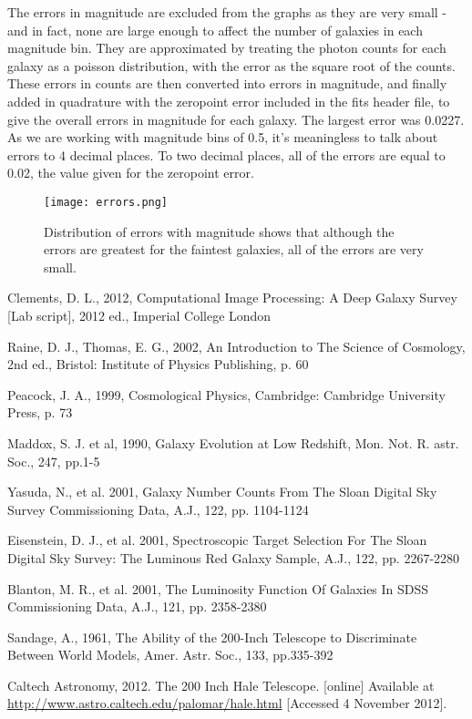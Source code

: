 \documentclass[a4paper,11pt,twoside]{article}
\begin{document}
The errors in magnitude are excluded from the graphs as they are very small - and in fact, none are large enough to affect the number of galaxies in each magnitude bin. 
They are approximated by treating the photon counts for each galaxy as a poisson distribution, with the error as the square root of the counts. These errors in counts are then converted into errors in magnitude, and finally added in quadrature with the zeropoint error included in the fits header file, to give the overall errors in magnitude for each galaxy. The largest error was 0.0227. As we are working with magnitude bins of 0.5, it's meaningless to talk about errors to 4 decimal places. To two decimal places, all of the errors are equal to 0.02, the value given for the zeropoint error. 

\begin{figure}[htb]
  \centering
  \texttt{[image: errors.png]}
  \caption{Distribution of errors with magnitude shows that although 
the errors are greatest for the faintest galaxies, 
all of the errors are very small.}
  \label{fig:errors}
\end{figure}

\begin{thebibliography}{9}

Clements, D. L., 2012, Computational Image Processing: A Deep Galaxy Survey [Lab script], 2012 ed., Imperial College London

Raine, D. J., Thomas, E. G., 2002, An Introduction to The Science of Cosmology, 2nd ed., Bristol: Institute of Physics Publishing, p. 60

Peacock, J. A., 1999, Cosmological Physics, Cambridge: Cambridge University Press, p. 73

Maddox, S. J. et al, 1990, Galaxy Evolution at Low Redshift, Mon. Not. R. astr. Soc., 247, pp.1-5

Yasuda, N., et al. 2001, Galaxy Number Counts From The Sloan Digital Sky Survey Commissioning Data, A.J., 122, pp. 1104-1124

Eisenstein, D. J., et al. 2001, Spectroscopic Target Selection For The Sloan Digital Sky Survey: The Luminous Red Galaxy Sample, A.J., 122, pp. 2267-2280

Blanton, M. R., et al. 2001, The Luminosity Function Of Galaxies In SDSS Commissioning Data, A.J., 121, pp. 2358-2380

Sandage, A., 1961, The Ability of the 200-Inch Telescope to Discriminate Between World Models, Amer. Astr. Soc., 133, pp.335-392

Caltech Astronomy, 2012. The 200 Inch Hale Telescope. [online] Available at \url{http://www.astro.caltech.edu/palomar/hale.html}
[Accessed 4 November 2012].

\end{thebibliography}
\end{document}
